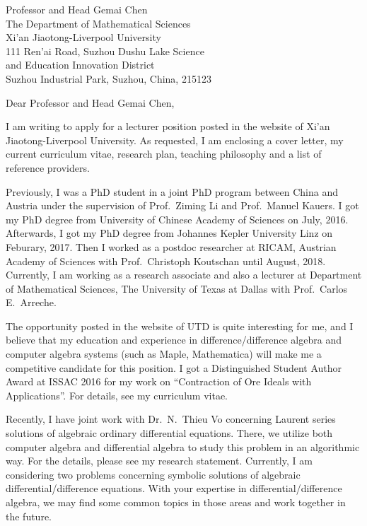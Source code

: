 \documentclass[11pt, a4paper]{letter} %
\begin{document}

\begin{letter}{
	Professor and Head Gemai Chen \\
	The Department of Mathematical Sciences\\
	Xi’an Jiaotong-Liverpool University\\
	111 Ren'ai Road, Suzhou Dushu Lake Science \\
	and Education Innovation District \\
	Suzhou Industrial Park, Suzhou, China, 215123
}


\opening{Dear Professor and Head Gemai Chen,}

I am writing to apply for a lecturer position posted in the website of Xi’an Jiaotong-Liverpool University. 
As requested, I am enclosing a cover letter, my current curriculum vitae, research plan, teaching philosophy and a list of reference providers. 

Previously, I was a PhD student in a joint PhD program between China and Austria under the supervision of Prof.\ Ziming Li and Prof.\ Manuel Kauers. 
I got my PhD degree from University of Chinese Academy of Sciences on July, 2016. 
Afterwards, I got my PhD degree from Johannes Kepler University Linz on Feburary, 2017. 
Then I worked as a postdoc researcher at RICAM, Austrian Academy of Sciences with Prof.\ Christoph Koutschan until August, 2018. Currently, 
I am working as a research associate and also a lecturer at Department of Mathematical Sciences, The University of Texas at Dallas with Prof.\ Carlos E.\ Arreche.

The opportunity posted in the website of UTD is quite interesting for me, 
and I believe that my education and experience in difference/difference algebra 
and computer algebra systems (such as Maple, Mathematica) will make me a competitive candidate for this position.
I got a Distinguished Student Author Award at ISSAC 2016 for my work on ``Contraction of Ore Ideals with Applications''. 
For details, see my curriculum vitae.

Recently, I have joint work with Dr.\ N.\ Thieu Vo concerning Laurent series solutions of algebraic ordinary differential equations. 
There, we utilize both computer algebra and differential algebra to study this problem in an algorithmic way. 
For the details, please see my research statement. 
Currently, I am considering two problems concerning symbolic solutions of algebraic differential/difference equations. 
With your expertise in differential/difference algebra, we may find some common topics in those areas and work together in the future. 


\end{letter}
\end{document}
